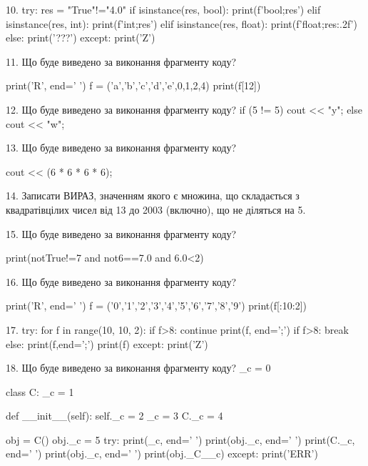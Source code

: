 \documentclass[11pt]{article}
\begin{document}
10. 
try:
    res = "True"!="4.0"
    if isinstance(res, bool):
        print(f'bool;{res}')
    elif isinstance(res, int):
        print(f'int;{res}')
    elif isinstance(res, float):
        print(f'float;{res:.2f}')
    else:
        print('???')
except:
    print('Z')


11. Що буде виведено за виконання фрагменту коду?

print('R', end=' ')
f = ('a','b','c','d','e',0,1,2,4)
print(f[12])



12. Що буде виведено за виконання фрагменту коду?
if (5 != 5)
    cout << "y";
else
    cout << "w";



13. Що буде виведено за виконання фрагменту коду?

cout << (6 * 6 * 6 * 6);


14. 
Записати ВИРАЗ, значенням якого є множина, що складається з квадратівцілих чисел від 13 до 2003 (включно), що не діляться на 5.

15. Що буде виведено за виконання фрагменту коду?

print(notTrue!=7 and not6==7.0 and 6.0<2)


16. Що буде виведено за виконання фрагменту коду?

print('R', end=' ')
f = ('0','1','2','3','4','5','6','7','8','9')
print(f[:10:2])



17. 
try:
    for f in range(10, 10, 2):
        if f>8:
            continue
        print(f, end=';')
        if f>8:
            break
    else:
        print(f,end=';')
    print(f)
except:
    print('Z')


18. Що буде виведено за виконання фрагменту коду?
_c = 0

class C:
    _c = 1
    
    def __init__(self):
        self._c = 2
        _c = 3
        C._c = 4

obj = C()
obj._c = 5
try:
    print(_c, end=' ')
    print(obj._c, end=' ')
    print(C._c, end=' ')
    print(obj._c, end=' ')
    print(obj._C__c)
except:
    print('ERR')
\end{document}
